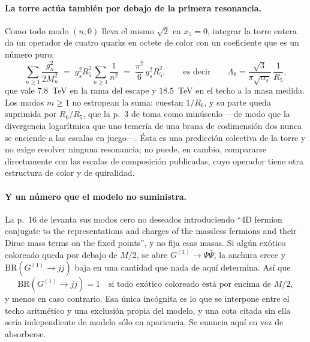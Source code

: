 \paragraph{La torre actúa también por debajo de la primera resonancia.} Como todo modo $(n,0)$
lleva el mismo $\sqrt2$ en $x_5=0$, integrar la torre entera da un operador de cuatro quarks en
octete de color con un coeficiente que es un número puro:
\begin{equation}\label{eq:tower}
  \sum_{n\ge1}\frac{g_n^2}{2M_n^2}
  \;=\;g_s^2R_5^2\sum_{n\ge1}\frac{1}{n^2}
  \;=\;\frac{\pi^2}{6}\,g_s^2R_5^2 ,
  \qquad\text{es decir}\qquad
  \Lambda_8=\frac{\sqrt3}{\pi\sqrt{\alpha_s}}\,\frac{1}{R_5},
\end{equation}
que vale $7.8$~TeV en la rama del escape y $18.5$~TeV en el techo a la masa medida. Los modos
$m\ge1$ no estropean la suma: cuestan $1/R_6$, y su parte queda suprimida por $R_6/R_5$, que la
p.~3 de \cite{KM25} toma como minúsculo ---de modo que la divergencia logarítmica que uno temería
de una brana de codimensión dos nunca se enciende a las escalas en juego---. Ésta es una predicción
colectiva de la torre y no exige resolver ninguna resonancia; no puede, en cambio, compararse
directamente con las escalas de composición publicadas, cuyo operador tiene otra estructura de
color y de quiralidad.

\paragraph{Y un número que el modelo no suministra.} La p.~16 de \cite{KM25} levanta sus modos cero
no deseados introduciendo ``4D fermion conjugate to the representations and charges of the massless
fermions and their Dirac mass terms on the fixed points'', y no fija esas masas. Si algún exótico
coloreado queda por debajo de $M/2$, se abre $G^{(1)}\to\Psi\bar\Psi$, la anchura crece y
$\mathrm{BR}(G^{(1)}\to jj)$ baja en una cantidad que nada de aquí determina. Así que
\begin{equation}\label{eq:brhole}
  \mathrm{BR}(G^{(1)}\to jj)=1 \quad\text{si todo exótico coloreado está por encima de } M/2,
\end{equation}
y menos en caso contrario. Esa única incógnita es lo que se interpone entre el techo aritmético y
una exclusión propia del modelo, y una cota citada sin ella sería independiente de modelo sólo en
apariencia. Se enuncia aquí en vez de absorberse.

